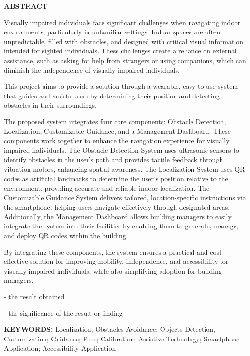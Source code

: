 

\newpage
\thispagestyle{plain}
\setcounter{page}{1}
\renewcommand{\thepage}{\roman{page}}

\begin{center}
    \Large\textbf{ABSTRACT}
\end{center}
\vspace{6pt}
Visually impaired individuals face significant challenges when navigating indoor environments, particularly in unfamiliar settings. Indoor spaces are often unpredictable, filled with obstacles, and designed with critical visual information intended for sighted individuals. These challenges create a reliance on external assistance, such as asking for help from strangers or using companions, which can diminish the independence of visually impaired individuals. 

This project aims to provide a solution through a wearable, easy-to-use system that guides and assists users by determining their position and detecting obstacles in their surroundings. 

The proposed system integrates four core components: Obstacle Detection, Localization, Customizable Guidance, and a Management Dashboard. These components work together to enhance the navigation experience for visually impaired individuals. The Obstacle Detection System uses ultrasonic sensors to identify obstacles in the user’s path and provides tactile feedback through vibration motors, enhancing spatial awareness. The Localization System uses QR codes as artificial landmarks to determine the user's position relative to the environment, providing accurate and reliable indoor localization. The Customizable Guidance System delivers tailored, location-specific instructions via the smartphone, helping users navigate effectively through designated areas. Additionally, the Management Dashboard allows building managers to easily integrate the system into their facilities by enabling them to generate, manage, and deploy QR codes within the building.

By integrating these components, the system ensures a practical and cost-effective solution for improving mobility, independence, and accessibility for visually impaired individuals, while also simplifying adoption for building managers.


\color{red}
- the result obtained

- the significance of the result or finding 
\color{black}

\vspace{18pt}
\noindent
\textbf{KEYWORDS:}  Localization; Obstacles Avoidance; Objects Detection, Customization; Guidance; Pose; Calibration; Assistive Technology; Smartphone Application; Accessibility Application
\vspace{3\baselineskip}